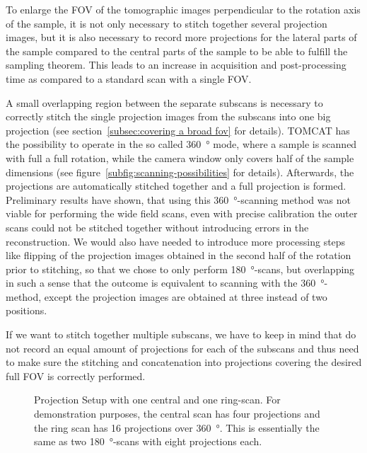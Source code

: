 To enlarge the FOV of the tomographic images perpendicular to the rotation axis of the sample, it is not only necessary to stitch together several projection images, but it is also necessary to record more projections for the lateral parts of the sample compared to the central parts of the sample to be able to fulfill the sampling theorem. This leads to an increase in acquisition and post-processing time as compared to a standard scan with a single FOV.%

A small overlapping region between the separate subscans is necessary to correctly stitch the single projection images from the subscans into one big projection (see section~\ref{subsec:covering a broad fov} for details). TOMCAT has the possibility to operate in the so called \SI{360}{\degree} mode, where a sample is scanned with full a full rotation, while the camera window only covers half of the sample dimensions (see figure~\ref{subfig:scanning-possibilities} for details). Afterwards, the projections are automatically stitched together and a full projection is formed. Preliminary results have shown, that using this \SI{360}{\degree}-scanning method was not viable for performing the wide field scans, even with precise calibration the outer scans could not be stitched together without introducing errors in the reconstruction. We would also have needed to introduce more processing steps like flipping of the projection images obtained in the second half of the rotation prior to stitching, so that we chose to only perform \SI{180}{\degree}-scans, but overlapping in such a sense that the outcome is equivalent to scanning with the \SI{360}{\degree}-method, except the projection images are obtained at three instead of two positions.

If we want to stitch together multiple subscans,  we have to keep in mind that do not record an equal amount of projections for each of the subscans and thus need to make sure the stitching and concatenation into projections covering the desired full FOV is correctly performed.

\begin{figure*}
	\centering
	
	\caption{Projection Setup with one central and one ring-scan. For demonstration purposes, the central scan has four projections and the ring scan has 16 projections over \SI{360}{\degree}. This is essentially the same as two \SI{180}{\degree}-scans with eight projections each.}
	\label{fig:projections}
\end{figure*}